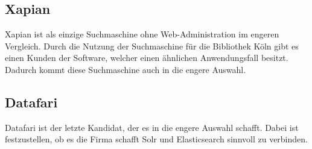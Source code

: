 \subsection{Xapian} 

Xapian ist als einzige Suchmaschine ohne Web-Administration im engeren Vergleich. Durch die Nutzung der Suchmaschine für die Bibliothek Köln gibt es einen Kunden der Software, welcher einen ähnlichen Anwendungsfall besitzt. \cite{Xapian.2019} Dadurch kommt diese Suchmaschine auch in die engere Auswahl. \cite{XAP.2019}

\subsection{Datafari}

Datafari ist der letzte Kandidat, der es in die engere Auswahl schafft. Dabei ist festzustellen, ob es die Firma schafft Solr und Elasticsearch sinnvoll zu verbinden.\cite{Labs.b}